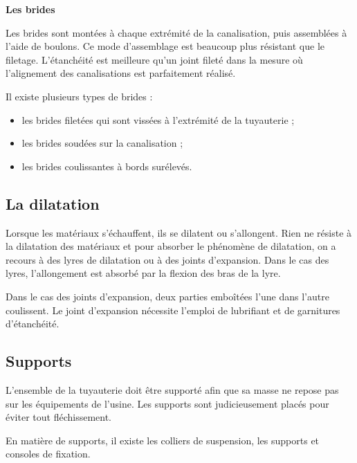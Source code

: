 \vspace{0.3cm}
\textbf{Les brides}
\vspace{0.3cm} 

Les brides sont montées à chaque extrémité de la canalisation, puis assemblées à l’aide de boulons. Ce mode d’assemblage est beaucoup plus résistant que le filetage. L’étanchéité est meilleure qu’un joint fileté dans la mesure où l’alignement des canalisations est parfaitement réalisé.
\vspace{0.3cm}

Il existe plusieurs types de brides :

\begin{itemize}
\item  les brides filetées qui sont vissées à l’extrémité de la tuyauterie ;
\item  les brides soudées sur la canalisation ;
\item  les brides coulissantes à bords surélevés.

\end{itemize}

\subsection{La dilatation}

Lorsque les matériaux s’échauffent, ils se dilatent ou s’allongent. Rien ne résiste à la dilatation des matériaux et pour absorber le phénomène de dilatation, on a recours à des lyres de dilatation ou à des joints d’expansion.
Dans le cas des lyres, l’allongement est absorbé par la flexion des bras de la lyre.

\vspace{0.3cm}

Dans le cas des joints d’expansion, deux parties emboîtées l’une dans l’autre coulissent. Le joint d’expansion nécessite l’emploi de lubrifiant et de garnitures d’étanchéité.


\subsection{Supports}

L’ensemble de la tuyauterie doit être supporté afin que sa masse ne repose pas sur 
les équipements de l’usine. Les supports sont judicieusement placés pour éviter tout fléchissement.

\vspace{0.3cm}

En matière de supports, il existe les colliers de suspension, les supports et consoles de 
fixation.



